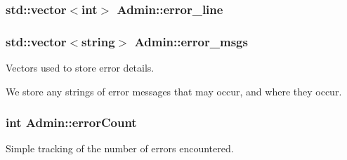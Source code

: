 \hypertarget{classAdmin_a2070f3b7ce2f309da1b080c3d3f07ecf}{
\subsubsection[{error\_\-line}]{\setlength{\rightskip}{0pt plus 5cm}std::vector$<$int$>$ {\bf Admin::error\_\-line}}}
\label{classAdmin_a2070f3b7ce2f309da1b080c3d3f07ecf}
\hypertarget{classAdmin_ad8c946fbb7ed32ad1f73a24eaf422c53}{
\subsubsection[{error\_\-msgs}]{\setlength{\rightskip}{0pt plus 5cm}std::vector$<$string$>$ {\bf Admin::error\_\-msgs}}}
\label{classAdmin_ad8c946fbb7ed32ad1f73a24eaf422c53}


Vectors used to store error details. 

We store any strings of error messages that may occur, and where they occur. \hypertarget{classAdmin_ae29edcd0464b203b35f72caba6af7295}{
\subsubsection[{errorCount}]{\setlength{\rightskip}{0pt plus 5cm}int {\bf Admin::errorCount}}}
\label{classAdmin_ae29edcd0464b203b35f72caba6af7295}


Simple tracking of the number of errors encountered. 

